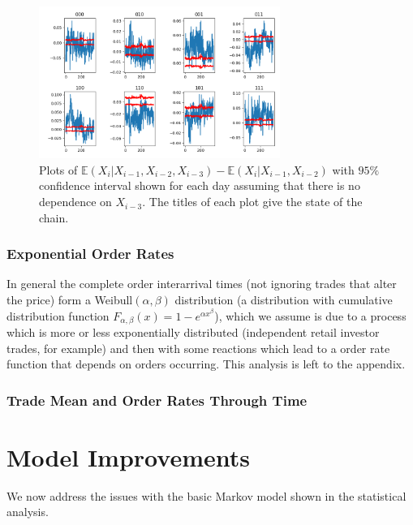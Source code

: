 \documentclass[a4paper,10pt]{article}
\begin{document}
\begin{figure}[h]
    \centering
    \includegraphics[width=0.7\textwidth]{images/2ndordermarkov}
    \caption{Plots of $\mathbb{E}(X_i | X_{i-1}, X_{i-2}, X_{i-3}) - \mathbb{E}(X_i | X_{i-1}, X_{i - 2})$ with $95\%$ confidence interval shown for each day assuming that there is no dependence on $X_{i-3}$. The titles of each plot give the state of the chain.}
    \label{CI952ndordermarkov}
\end{figure}
\subsubsection{Exponential Order Rates}
In general the complete order interarrival times (not ignoring trades that alter the price) form a Weibull$(\alpha, \beta)$ distribution (a distribution with cumulative distribution function $F_{\alpha,\beta}(x) = 1 - e^{\alpha x^\beta}$), which we assume is due to a process which is more or less exponentially distributed (independent retail investor trades, for example) and then with some reactions which lead to a order rate function that depends on orders occurring. This analysis is left to the appendix.
\subsubsection{Trade Mean and Order Rates Through Time}
\section{Model Improvements}
We now address the issues with the basic Markov model shown in the statistical analysis.
\end{document}

